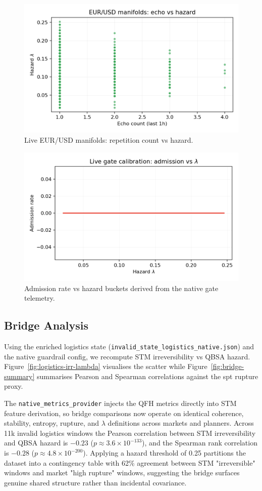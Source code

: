 \documentclass[11pt]{article}
\begin{document}
\begin{figure}[t]
  \centering
  \includegraphics[width=0.75\linewidth]{../figures/fig2_spt_echo_vs_lambda.png}
  \caption{Live EUR/USD manifolds: repetition count vs hazard.}
  \label{fig:echo-vs-lambda}
\end{figure}

\begin{figure}[t]
  \centering
  \includegraphics[width=0.75\linewidth]{../figures/fig2b_spt_lambda_calibration.png}
  \caption{Admission rate vs hazard buckets derived from the native gate telemetry.}
  \label{fig:lambda-admission}
\end{figure}

\subsection{Bridge Analysis}
Using the enriched logistics state (\texttt{invalid\_state\_logistics\_native.json}) and the native guardrail config, we recompute STM irreversibility vs QBSA hazard. Figure~\ref{fig:logistics-irr-lambda} visualises the scatter while Figure~\ref{fig:bridge-summary} summarises Pearson and Spearman correlations against the spt rupture proxy.

The \texttt{native\_metrics\_provider} injects the QFH metrics directly into STM feature derivation, so bridge comparisons now operate on identical coherence, stability, entropy, rupture, and $\lambda$ definitions across markets and planners. Across 11k invalid logistics windows the Pearson correlation between STM irreversibility and QBSA hazard is \(-0.23\) (\(p\approx 3.6\times10^{-133}\)), and the Spearman rank correlation is \(-0.28\) (\(p\approx 4.8\times10^{-200}\)). Applying a hazard threshold of 0.25 partitions the dataset into a contingency table with 62\% agreement between STM "irreversible" windows and market "high rupture" windows, suggesting the bridge surfaces genuine shared structure rather than incidental covariance.
\end{document}
